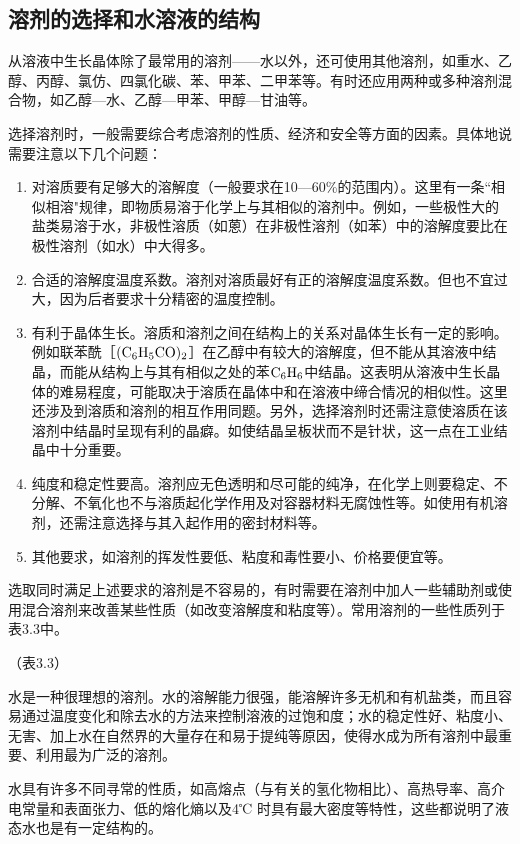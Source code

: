 ﻿\subsection{溶剂的选择和水溶液的结构}
从溶液中生长晶体除了最常用的溶剂——水以外，还可使用其他溶剂，如重水、乙醇、丙醇、氯仿、四氯化碳、苯、甲苯、二甲苯等。有时还应用两种或多种溶剂混合物，如乙醇—水、乙醇—甲苯、甲醇—甘油等。

选择溶剂时，一般需要综合考虑溶剂的性质、经济和安全等方面的因素。具体地说需要注意以下几个问题：
\begin{enumerate}[(1)]\itemsep -0.5ex
\item 对溶质要有足够大的溶解度（一般要求在10---60\%的范围内）。这里有一条“相似相溶"规律，即物质易溶于化学上与其相似的溶剂中。例如，一些极性大的盐类易溶于水，非极性溶质（如蒽）在非极性溶剂（如苯）中的溶解度要比在极性溶剂（如水）中大得多。
\item 合适的溶解度温度系数。溶剂对溶质最好有正的溶解度温度系数。但也不宜过大，因为后者要求十分精密的温度控制。
\item 有利于晶体生长。溶质和溶剂之间在结构上的关系对晶体生长有一定的影响。例如联苯酰［$\rm (C_6H_5CO)_2$］在乙醇中有较大的溶解度，但不能从其溶液中结晶，而能从结构上与其有相似之处的苯$\rm C_6H_6$中结晶。这表明从溶液中生长晶体的难易程度，可能取决于溶质在晶体中和在溶液中缔合情况的相似性。这里还涉及到溶质和溶剂的相互作用同题。另外，选择溶剂时还需注意使溶质在该溶剂中结晶时呈现有利的晶癖。如使结晶呈板状而不是针状，这一点在工业结晶中十分重要。
\item 纯度和稳定性要高。溶剂应无色透明和尽可能的纯净，在化学上则要稳定、不分解、不氧化也不与溶质起化学作用及对容器材料无腐蚀性等。如使用有机溶剂，还需注意选择与其入起作用的密封材料等。
\item 其他要求，如溶剂的挥发性要低、粘度和毒性要小、价格要便宜等。
\end{enumerate}

选取同时满足上述要求的溶剂是不容易的，有时需要在溶剂中加人一些辅助剂或使用混合溶剂来改善某些性质（如改变溶解度和粘度等）。常用溶剂的一些性质列于表3.3中。

（表3.3）

水是一种很理想的溶剂。水的溶解能力很强，能溶解许多无机和有机盐类，而且容易通过温度变化和除去水的方法来控制溶液的过饱和度；水的稳定性好、粘度小、无害、加上水在自然界的大量存在和易于提纯等原因，使得水成为所有溶剂中最重要、利用最为广泛的溶剂。

水具有许多不同寻常的性质，如高熔点（与有关的氢化物相比）、高热导率、高介电常量和表面张力、低的熔化熵以及4℃ 时具有最大密度等特性，这些都说明了液态水也是有一定结构的。

